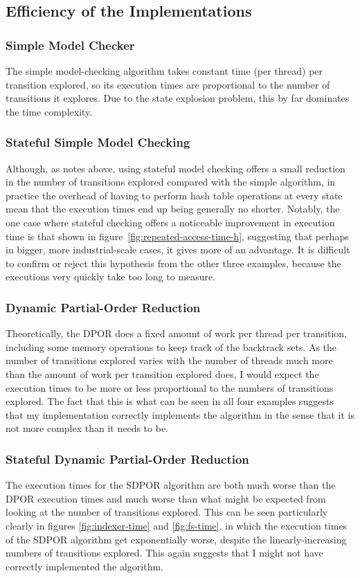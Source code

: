\documentclass[12pt,a4paper,twoside,openright]{report}
\begin{document}
\subsection{Efficiency of the Implementations}
\subsubsection{Simple Model Checker}
The simple model-checking algorithm takes
constant time (per thread) per transition
explored, so its execution times are
proportional to the number of transitions it
explores. Due to the state explosion problem,
this by far dominates the time complexity.

\subsubsection{Stateful Simple Model Checking}
Although, as notes above, using stateful model
checking offers a small reduction in the number
of transitions explored compared with the simple
algorithm, in practice the overhead of having
to perform hash table operations at every state
mean that the execution times end up being
generally no shorter. Notably, the one
case where stateful checking offers a noticeable
improvement in execution time is that shown in
figure~\ref{fig:repeated-access-time-h},
suggesting that perhaps in bigger, more
industrial-scale cases, it gives more of
an advantage. It is difficult to confirm
or reject this hypothesis from the other three examples,
because the executions very quickly take too
long to measure.

\subsubsection{Dynamic Partial-Order Reduction}
Theoretically, the DPOR does a fixed amount of
work per thread per transition, including some
memory operations to keep track of the backtrack
sets. As the number of transitions explored
varies with
the number of threads much more than the amount
of work per transition explored does, I would
expect the execution times to be more or less
proportional to the numbers of transitions
explored. The fact that this is what can be
seen in all four examples suggests that my
implementation correctly implements the
algorithm in the sense that it is not more
complex than it needs to be.

\subsubsection{Stateful Dynamic Partial-Order Reduction}
The execution times for the SDPOR algorithm
are both much worse than the DPOR execution
times and much worse than what might be
expected from looking at the number of
transitions explored. This can be
seen particularly clearly in figures
\ref{fig:indexer-time} and \ref{fig:fs-time},
in which the execution times of the SDPOR
algorithm get exponentially worse, despite
the linearly-increasing numbers of
transitions explored. This again
suggests that I might not have
correctly implemented the algorithm.
\end{document}
